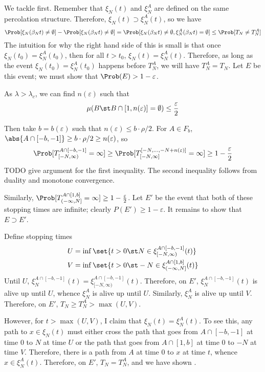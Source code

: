 \documentclass{scrartcl}
\newcommand{\ep}{\varepsilon}
\begin{document}
We tackle  first. Remember that $\xi_{N}(t)$ and $\xi_{N}^{A}$ are defined on the same percolation structure. Therefore, $\xi_{N}(t) \supset \xi_{N}^{A}(t)$, so we have
\[ \Prob[\xi_{N}(\beta_{N} t) \neq \emptyset] - \Prob[\xi_{N}(\beta_{N} t) \neq \emptyset] = \Prob[\xi_{N}(\beta_{N} t) \neq \emptyset, \xi_{N}^{A}(\beta_{N} t) = \emptyset] \leq \Prob[T_{N} \neq T_{N}^{A}] \]
The intuition for why the right hand side of this is small is that once $\xi_{N}(t_{0}) = \xi_{N}^{A}(t_{0})$, then for all $t > t_{0}$, $\xi_{N}(t) = \xi_{N}^{A}(t)$. Therefore, as long as the event $\xi_{N}(t_{0}) = \xi_{N}^{A}(t_{0})$ happens before $T_{N}^{A}$, we will have $T_{N}^{A} = T_{N}$. Let $E$ be this event; we must show that $\Prob(E) > 1 - \ep$.

As $\lambda > \lambda_{c}$, we can find $n(\ep)$ such that
\[ \mu(B \st B \cap [1,n(\ep)] = \emptyset) \leq \frac{\ep}{2} \]

Then take $b = b(\ep)$ such that $n(\ep) \leq b \cdot \rho/2$. For $A \in F_{b}$, $\abs{A \cap [-b,-1]} \geq b \cdot \rho/2 \geq n(\ep)$, so
\[ \Prob[T_{[-N,\infty)}^{A \cap [-b,-1]} = \infty] \geq \Prob[T_{[-N,\infty]}^{[-N,\ldots,-N+n(\ep)]} = \infty] \geq 1 - \frac{\ep}{2} \]
TODO give argument for the first inequality. The second inequality follows from duality and monotone convergence.

Similarly, $\Prob[T_{(-\infty,N]}^{A \cap [1,b]} = \infty] \geq 1 - \frac{\ep}{2}$. Let $E'$ be the event that both of these stopping times are infinite; clearly $P(E') \geq 1 - \ep$. It remains to show that $E \supset E'$.

Define stopping times
\begin{align*}
  U &= \inf\set{t > 0 \st N \in \xi_{[-N,\infty)}^{A \cap [-b,-1]}(t)} \\
  V &= \inf\set{t > 0 \st -N \in \xi_{(-\infty,N]}^{A \cap [1,b]}(t)}
\end{align*}
Until $U$, $\xi_{N}^{A \cap [-b,-1]}(t) = \xi_{[-N,\infty)}^{A \cap [-b,-1]}(t)$. Therefore, on $E'$, $\xi_{N}^{A \cap [-b,-1]}(t)$ is alive up until $U$, whence $\xi_{N}^{A}$ is alive up until $U$. Similarly, $\xi_{N}^{A}$ is alive up until $V$. Therefore, on $E'$, $T_{N} \geq T_{N}^{A} > \max(U,V)$.

However, for $t > \max(U,V)$, I claim that $\xi_{N}(t) = \xi_{N}^{A}(t)$. To see this, any path to $x \in \xi_{N}(t)$ must either cross the path that goes from $A \cap [-b,-1]$ at time $0$ to $N$ at time $U$ or the path that goes from $A \cap [1,b]$ at time $0$ to $-N$ at time $V$. Therefore, there is a path from $A$ at time $0$ to $x$ at time $t$, whence $x \in \xi_{N}^{A}(t)$. Therefore, on $E'$, $T_{N} = T_{N}^{A}$, and we have shown .
\end{document}
